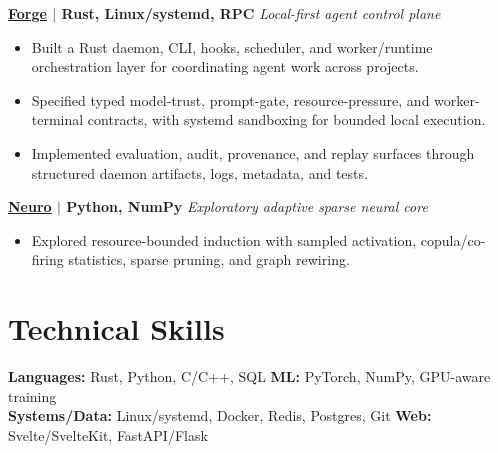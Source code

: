 \documentclass[letterpaper,11pt]{article}
\newcommand{\resumeItem}[1]{\item\small{#1}}
\newcommand{\resumeProject}[2]{%
  \vspace{1pt}\textbf{#1} \hfill {\small\textit{#2}}\\[-5pt]
}
\newcommand{\resumeListStart}{\begin{itemize}[label={-},leftmargin=0.18in,itemsep=1pt,topsep=2pt,parsep=0pt,partopsep=0pt]}
\newcommand{\resumeListEnd}{\end{itemize}\vspace{-2pt}}
\begin{document}
\resumeProject{\href{https://github.com/nyx-haile/forge}{Forge} $\mid$ Rust, Linux/systemd, RPC}{Local-first agent control plane}
\resumeListStart
  \resumeItem{Built a Rust daemon, CLI, hooks, scheduler, and worker/runtime orchestration layer for coordinating agent work across projects.}
  \resumeItem{Specified typed model-trust, prompt-gate, resource-pressure, and worker-terminal contracts, with systemd sandboxing for bounded local execution.}
  \resumeItem{Implemented evaluation, audit, provenance, and replay surfaces through structured daemon artifacts, logs, metadata, and tests.}
\resumeListEnd

\resumeProject{\href{https://github.com/nyx-haile/neuro}{Neuro} $\mid$ Python, NumPy}{Exploratory adaptive sparse neural core}
\resumeListStart
  \resumeItem{Explored resource-bounded induction with sampled activation, copula/co-firing statistics, sparse pruning, and graph rewiring.}
\resumeListEnd

\section{Technical Skills}
\small\textbf{Languages:} Rust, Python, C/C++, SQL \quad
\textbf{ML:} PyTorch, NumPy, GPU-aware training\\
\small\textbf{Systems/Data:} Linux/systemd, Docker, Redis, Postgres, Git \quad
\textbf{Web:} Svelte/SvelteKit, FastAPI/Flask
\end{document}
